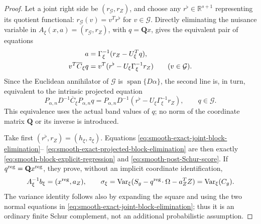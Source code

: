 \documentclass[11pt]{article}
\numberwithin{equation}{section}
\theoremstyle{definition}
\theoremstyle{remark}
\newcommand{\1}{\mathbf 1}
\begin{document}
\begin{proof}
Let a joint right side be \((r_{\mathcal G},r_Z)\), and choose any
\(r^\flat\in\mathbb R^{s+1}\) representing its quotient functional:
\(r_{\mathcal G}(v)=v^Tr^\flat\) for \(v\in\mathcal G\).  Directly
eliminating the nuisance variable in
\(A_\xi(x,a)=(r_{\mathcal G},r_Z)\), with \(q=\mathbf Qx\), gives the
equivalent pair of equations
\begin{align}
 a&=\Gamma_\xi^{-1}(r_Z-U_\xi^Tq),\notag\\
 v^T\overline C_\xi q
   &=v^T(r^\flat-U_\xi\Gamma_\xi^{-1}r_Z)
                         \qquad(v\in\mathcal G).
 \label{eq:smooth-exact-joint-block-elimination}
\end{align}
Since the Euclidean annihilator of \(\mathcal G\) is
\(\operatorname{span}\{D\alpha\}\), the second line is, in turn,
equivalent to the intrinsic projected equation
\begin{equation}
 P_{\alpha,n}D^{-1}\overline C_\xi P_{\alpha,n}q
 =P_{\alpha,n}D^{-1}
       (r^\flat-U_\xi\Gamma_\xi^{-1}r_Z),
 \qquad q\in\mathcal G.
 \label{eq:smooth-exact-projected-block-elimination}
\end{equation}
This equivalence uses the actual band values of \(q\); no norm of the
coordinate matrix \(\mathbf Q\) or its inverse is introduced.

Take first \((r^\flat,r_Z)=(h_\xi,z_\xi)\).  Equations
\eqref{eq:smooth-exact-joint-block-elimination}--
\eqref{eq:smooth-exact-projected-block-elimination} are then exactly
\eqref{eq:smooth-block-explicit-regression} and
\eqref{eq:smooth-post-Schur-score}.  If
\(q^{\rm reg}=\mathbf Qx^{\rm reg}\), they prove, without an implicit
coordinate identification,
\begin{equation}
 A_\xi^{-1}b_\xi=(x^{\rm reg},a_Z),\qquad
 \sigma_\xi=\operatorname{Var}_\xi
   (S_g-q^{\rm reg}\!\cdot\Omega-a_Z^TZ)
 =\operatorname{Var}_\xi(C_g).
 \label{eq:smooth-exact-full-regression-identification}
\end{equation}
The variance identity follows also by expanding the square and using the
two normal equations in
\eqref{eq:smooth-exact-joint-block-elimination}; thus it is an ordinary
finite Schur complement, not an additional probabilistic assumption.


\end{proof}
\end{document}
